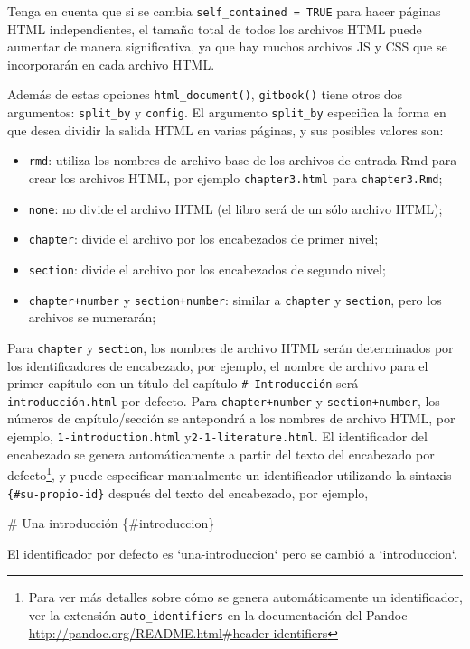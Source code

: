 \documentclass[12pt,]{krantz}
\makeatletter
\newenvironment{Shaded}{\begin{snugshade}}{\end{snugshade}}
\newcommand{\BaseNTok}[1]{\textcolor[rgb]{0.00,0.00,0.81}{{#1}}}
\newcommand{\FunctionTok}[1]{\textcolor[rgb]{0.00,0.00,0.00}{{#1}}}
\newcommand{\NormalTok}[1]{{#1}}
\providecommand{\tightlist}{%
  \setlength{\itemsep}{0pt}\setlength{\parskip}{0pt}}
\newenvironment{kframe}{%
\medskip{}
\setlength{\fboxsep}{.8em}
 \def\at@end@of@kframe{}%
 \ifinner\ifhmode%
  \def\at@end@of@kframe{\end{minipage}}%
  \begin{minipage}{\columnwidth}%
 \fi\fi%
 \def\FrameCommand##1{\hskip\@totalleftmargin \hskip-\fboxsep
 \colorbox{shadecolor}{##1}\hskip-\fboxsep
     \hskip-\linewidth \hskip-\@totalleftmargin \hskip\columnwidth}%
 \MakeFramed {\advance\hsize-\width
   \@totalleftmargin\z@ \linewidth\hsize
   \@setminipage}}%
 {\par\unskip\endMakeFramed%
 \at@end@of@kframe}
\renewenvironment{Shaded}{\begin{kframe}}{\end{kframe}}
\theoremstyle{definition}
\theoremstyle{definition}
\theoremstyle{remark}
\makeatother
\begin{document}
Tenga en cuenta que si se cambia \texttt{self\_contained\ =\ TRUE} para
hacer páginas HTML independientes, el tamaño total de todos los archivos
HTML puede aumentar de manera significativa, ya que hay muchos archivos
JS y CSS que se incorporarán en cada archivo HTML.

Además de estas opciones \texttt{html\_document()}, \texttt{gitbook()}
tiene otros dos argumentos: \texttt{split\_by} y \texttt{config}. El
argumento \texttt{split\_by} especifica la forma en que desea dividir la
salida HTML en varias páginas, y sus posibles valores son:

\begin{itemize}
\tightlist
\item
  \texttt{rmd}: utiliza los nombres de archivo base de los archivos de
  entrada Rmd para crear los archivos HTML, por ejemplo
  \texttt{chapter3.html} para \texttt{chapter3.Rmd};
\item
  \texttt{none}: no divide el archivo HTML (el libro será de un sólo
  archivo HTML);
\item
  \texttt{chapter}: divide el archivo por los encabezados de primer
  nivel;
\item
  \texttt{section}: divide el archivo por los encabezados de segundo
  nivel;
\item
  \texttt{chapter+number} y \texttt{section+number}: similar a
  \texttt{chapter} y \texttt{section}, pero los archivos se numerarán;
\end{itemize}

Para \texttt{chapter} y \texttt{section}, los nombres de archivo HTML
serán determinados por los identificadores de encabezado, por ejemplo,
el nombre de archivo para el primer capítulo con un título del capítulo
\texttt{\#\ Introducción} será \texttt{introducción.html} por defecto.
Para \texttt{chapter+number} y \texttt{section+number}, los números de
capítulo/sección se antepondrá a los nombres de archivo HTML, por
ejemplo, \texttt{1-introduction.html} y\texttt{2-1-literature.html}. El
identificador del encabezado se genera automáticamente a partir del
texto del encabezado por defecto\footnote{Para ver más detalles sobre
  cómo se genera automáticamente un identificador, ver la extensión
  \texttt{auto\_identifiers} en la documentación del Pandoc
  \url{http://pandoc.org/README.html\#header-identifiers}}, y puede
especificar manualmente un identificador utilizando la sintaxis
\texttt{\{\#su-propio-id\}} después del texto del encabezado, por
ejemplo,

\begin{Shaded}
\begin{Highlighting}[]
\FunctionTok{# Una introducción \{#introduccion\}}

\NormalTok{El identificador por defecto es }\BaseNTok{`una-introduccion`} \NormalTok{pero se cambió a }\BaseNTok{`introduccion`}\NormalTok{.}
\end{Highlighting}
\end{Shaded}
\end{document}

